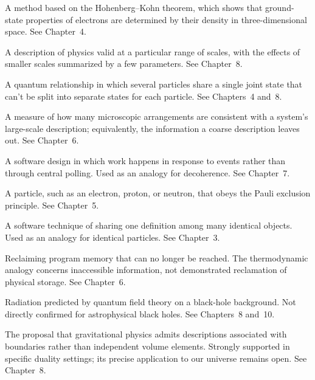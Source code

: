 \begin{description}[
    style=nextline,
    leftmargin=2.2em,
    labelwidth=2em,
    labelsep=0.4em,
    itemsep=0.65em,
    parsep=0pt,
    topsep=0.25em
]
\item[Density functional theory] A method based on the Hohenberg--Kohn theorem, which shows that ground-state properties of electrons are determined by their density in three-dimensional space. See Chapter~4.

\item[Effective field theory] A description of physics valid at a particular range of scales, with the effects of smaller scales summarized by a few parameters. See Chapter~8.

\item[Entanglement] A quantum relationship in which several particles share a single joint state that can't be split into separate states for each particle. See Chapters~4 and~8.

\item[Entropy] A measure of how many microscopic arrangements are consistent with a system's large-scale description; equivalently, the information a coarse description leaves out. See Chapter~6.

\item[Event-driven architecture] A software design in which work happens in response to events rather than through central polling. Used as an analogy for decoherence. See Chapter~7.

\item[Fermion] A particle, such as an electron, proton, or neutron, that obeys the Pauli exclusion principle. See Chapter~5.

\item[Flyweight pattern] A software technique of sharing one definition among many identical objects. Used as an analogy for identical particles. See Chapter~3.

\item[Garbage collection] Reclaiming program memory that can no longer be reached. The thermodynamic analogy concerns inaccessible information, not demonstrated reclamation of physical storage. See Chapter~6.

\item[Hawking radiation] Radiation predicted by quantum field theory on a black-hole background. Not directly confirmed for astrophysical black holes. See Chapters~8 and~10.

\item[Holographic principle] The proposal that gravitational physics admits descriptions associated with boundaries rather than independent volume elements. Strongly supported in specific duality settings; its precise application to our universe remains open. See Chapter~8.


\end{description}

